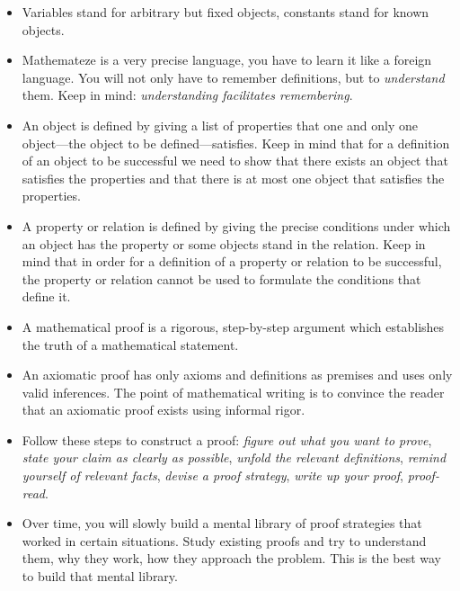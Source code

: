 	\begin{itemize}
			
		\item Variables stand for arbitrary but fixed objects, constants stand for known objects. 
	
		\item Mathemateze is a very precise language, you have to learn it like a foreign language. You will not only have to remember definitions, but to \emph{understand} them. Keep in mind: \emph{understanding facilitates remembering}.
		
		\item An object is defined by giving a list of properties that one and only one object---the object to be defined---satisfies. Keep in mind that for a definition of an object to be successful we need to show that there exists an object that satisfies the properties and that there is at most one object that satisfies the properties.
		
		\item A property or relation is defined by giving the precise conditions under which an object has the property or some objects stand in the relation. Keep in mind that in order for a definition of a property or relation to be successful, the property or relation cannot be used to formulate the conditions that define it.
	
		\item A mathematical proof is a rigorous, step-by-step argument which establishes the truth of a mathematical statement. 
		
		\item An axiomatic proof has only axioms and definitions as premises and uses only valid inferences. The point of mathematical writing is to convince the reader that an axiomatic proof exists using informal rigor. 
		
		\item Follow these steps to construct a proof: \emph{figure out what you want to prove}, \emph{state your claim as clearly as possible}, \emph{unfold the relevant definitions}, \emph{remind yourself of relevant facts}, \emph{devise a proof strategy}, \emph{write up your proof}, \emph{proof-read}.
		
		
		\item Over time, you will slowly build a mental library of proof strategies that worked in certain situations. Study existing proofs and try to understand them, why they work, how they approach the problem. This is the best way to build that mental library.
					
	\end{itemize}
	
